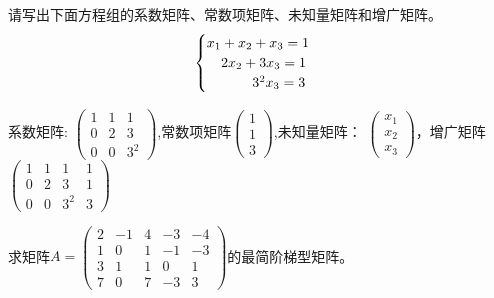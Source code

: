 \documentclass[a4paper]{report}
\begin{document}
\EX 请写出下面方程组的系数矩阵、常数项矩阵、未知量矩阵和增广矩阵。
\begin{equation*}
\begin{cases}
x_{1}+x_{2}+x_{3} = 1&\\
\hphantom{x_{1}} 2x_{2}+3x_{3} = 1&\\
\hphantom{x_{1}+x_{2}}3^2x_{3} = 3&
\end{cases}
\end{equation*}

\begin{jie}
系数矩阵:
$
\begin{pmatrix}
1&1&1\\ 0&2&3\\0&0&3^2
\end{pmatrix}
$,常数项矩阵$
\begin{pmatrix}
1\\ 1\\ 3
\end{pmatrix}
$,未知量矩阵：
$
\begin{pmatrix}
x_1\\ x_2\\ x_3
\end{pmatrix}
$，增广矩阵
$
\begin{pmatrix}
1&1&1&1\\ 0&2&3&1\\0&0&3^2&3
\end{pmatrix}
$
\end{jie}

\EX 求矩阵$A=
\begin{pmatrix}
2 &-1&4&-3&-4\\ 1&0&1&-1&-3\\ 3&1&1&0&1\\ 7&0&7&-3&3
\end{pmatrix}
$的最简阶梯型矩阵。
\end{document}
